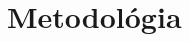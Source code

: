 \documentclass[a4paper,conference]{IEEEtran}
\begin{document}



\section{Metodológia}
\label{sec3}
\end{document}
